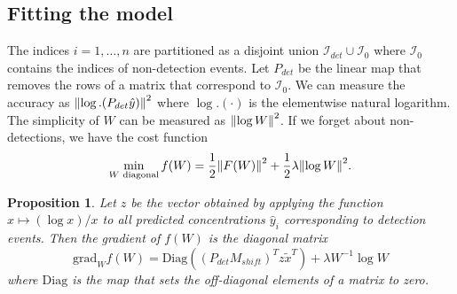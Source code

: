 \documentclass{article}
\newtheorem{proposition}{Proposition}
\begin{document}
\subsection{Fitting the model}
The indices $i = 1,\dots,n$ are partitioned as a disjoint union $\mathcal{I}_{det} \cup \mathcal{I}_{0}$ where $\mathcal{I}_0$ contains the indices of non-detection events. Let $P_{det}$ be the linear map that removes the rows of a matrix that correspond to $\mathcal{I}_0$. We can measure the accuracy as $\norm{\log.(P_{det} \hat{y})}^2$ where $\log.(\cdot)$ is the elementwise natural logarithm. The simplicity of $W$ can be measured as $\norm{\log W}^2$. If we forget about non-detections, we have the cost function 
$$
\min_{W \text{ diagonal}} f(W) =
\frac{1}{2}\norm{F(W)}^2 + \frac{1}{2}\lambda \norm{\log W}^2
.$$
\begin{proposition}
    Let $z$ be the vector obtained by applying the function $x \mapsto (\log x) / x$ to all predicted concentrations $\hat{y}_i$ corresponding to detection events. Then the gradient of $f(W)$ is the diagonal matrix
    $$
    \mathrm{grad}_{W} f(W) = \mathrm{Diag}\left((P_{det} M_{shift})^T z \tilde{x}^T\right) + \lambda W^{-1} \log W
    $$
    where $\mathrm{Diag}$ is the map that sets the off-diagonal elements of a matrix to zero.
\end{proposition}
\end{document}
